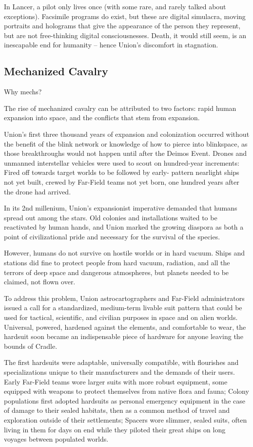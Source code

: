 In Lancer, a pilot only lives once (with some rare, and rarely talked about exceptions). Facsimile
programs do exist, but these are digital simulacra, moving portraits and holograms that give the
appearance of the person they represent, but are not free-thinking digital consciousnesses.
Death, it would still seem, is an inescapable end for humanity -- hence Union’s discomfort in
stagnation.

\subsection{Mechanized Cavalry}

Why mechs?

The rise of mechanized cavalry can be attributed to two factors: rapid human expansion into
space, and the conflicts that stem from expansion.

Union’s first three thousand years of expansion and colonization occurred without the benefit of
the blink network or knowledge of how to pierce into blinkspace, as those breakthroughs would
not happen until after the Deimos Event. Drones and unmanned interstellar vehicles were used to
scout on hundred-year increments: Fired off towards target worlds to be followed by early-
pattern nearlight ships not yet built, crewed by Far-Field teams not yet born, one hundred years
after the drone had arrived.

In its 2nd millenium, Union’s expansionist imperative demanded that humans spread out among
the stars. Old colonies and installations waited to be reactivated by human hands, and Union
marked the growing diaspora as both a point of civilizational pride and necessary for the survival
of the species.

However, humans do not survive on hostile worlds or in hard vacuum. Ships and stations did fine
to protect people from hard vacuum, radiation, and all the terrors of deep space and dangerous
atmospheres, but planets needed to be claimed, not flown over.

To address this problem, Union astrocartographers and Far-Field administrators issued a call for
a standardized, medium-term livable suit pattern that could be used for tactical, scientific, and
civilian purposes in space and on alien worlds. Universal, powered, hardened against the
elements, and comfortable to wear, the hardsuit soon became an indispensable piece of
hardware for anyone leaving the bounds of Cradle.

The first hardsuits were adaptable, universally compatible, with flourishes and specializations
unique to their manufacturers and the demands of their users. Early Far-Field teams wore larger
suits with more robust equipment, some equipped with weapons to protect themselves from
native flora and fauna; Colony populations first adopted hardsuits as personal emergency
equipment in the case of damage to their sealed habitats, then as a common method of travel
and exploration outside of their settlements; Spacers wore slimmer, sealed suits, often living in
them for days on end while they piloted their great ships on long voyages between populated
worlds.

